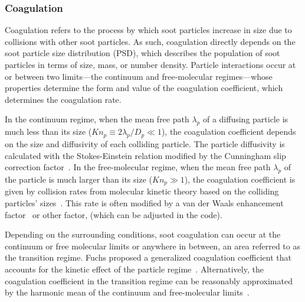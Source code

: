 \documentclass[preprint,letterpaper]{elsarticle}
\begin{document}
\subsubsection{Coagulation}
\label{s:coa}

Coagulation refers to the process by which soot particles increase in size due to collisions with other soot particles. As such, coagulation directly depends on the soot particle size distribution (PSD), which describes the population of soot particles in terms of size, mass, or number density.
Particle interactions occur at or between two limits---the continuum and free-molecular regimes---whose properties determine the form and value of the coagulation coefficient, which determines the coagulation rate.

In the continuum regime, when the mean free path $\lambda_p$ of a diffusing particle is much less than its size ($\mathit{Kn}_p\equiv 2\lambda_p/D_p\ll1$), the coagulation coefficient depends on the size and diffusivity of each colliding particle. The particle diffusivity is calculated with the Stokes-Einstein relation modified by the Cunningham slip correction factor~\cite{Seinfeld_2016}.
In the free-molecular regime, when the mean free path $\lambda_p$ of the particle is much larger than its size ($\mathit{Kn}_p\gg1$), the coagulation coefficient is given by collision rates from molecular kinetic theory based on the colliding particles' sizes~\cite{Seinfeld_2016}. This rate is often modified by a van der Waals enhancement factor~\cite{Harris_1988} or other factor, (which can be adjusted in the code).

Depending on the surrounding conditions, soot coagulation can occur at the continuum or free molecular limits or anywhere in between, an area referred to as the transition regime. Fuchs proposed a generalized coagulation coefficient that accounts for the kinetic effect of the particle regime~\cite{Fuchs_1964, Seinfeld_2016}. Alternatively, the coagulation coefficient in the transition regime can be reasonably approximated by the harmonic mean of the continuum and free-molecular limits~\cite{Kazakov_1998,Frenklach_2002b}.
\end{document}
